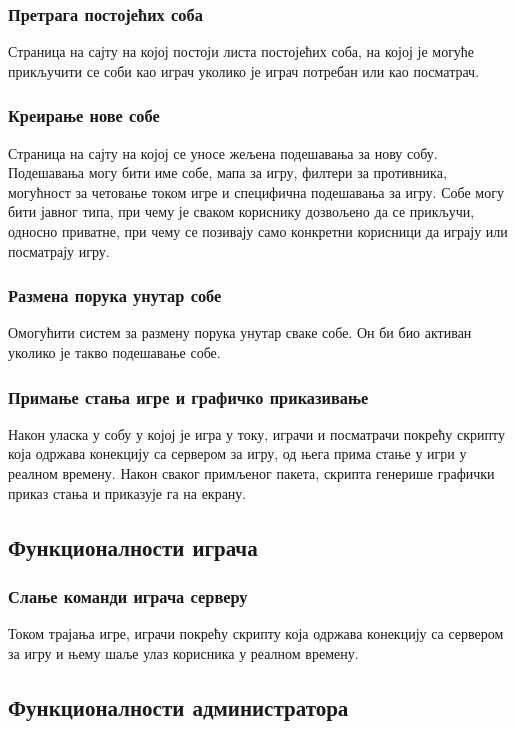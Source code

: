 \subsubsection{Претрага постојећих соба}
Страница на сајту на којој постоји листа постојећих соба, на којој је могуће прикључити се соби као играч уколико
је играч потребан или као посматрач.

\subsubsection{Креирање нове собе}
Страница на сајту на којој се уносе жељена подешавања за нову собу. Подешавања могу бити име собе, мапа за игру,
филтери за противника, могућност за четовање током игре и специфична подешавања за игру. Собе могу бити јавног
типа, при чему је сваком кориснику дозвољено да се прикључи, односно приватне, при чему се позивају само конкретни
корисници да играју или посматрају игру.

\subsubsection{Размена порука унутар собе}
Омогућити систем за размену порука унутар сваке собе. Он би био активан уколико је такво подешавање собе.

\subsubsection{Примање стања игре и графичко приказивање}
Након уласка у собу у којој је игра у току, играчи и посматрачи покрећу скрипту која одржава конекцију са сервером
за игру, од њега прима стање у игри у реалном времену. Након сваког примљеног пакета, скрипта генерише графички
приказ стања и приказује га на екрану.

\subsection{Функционалности играча}

\subsubsection{Слање команди играча серверу}
Током трајања игре, играчи покрећу скрипту која одржава конекцију са сервером за игру и њему шаље улаз корисника
у реалном времену.

\subsection{Функционалности администратора}

